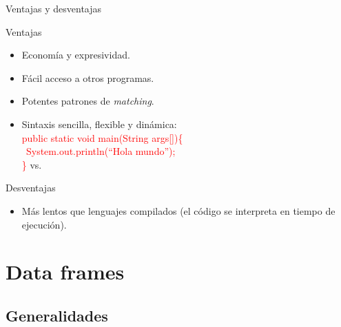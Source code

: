 \documentclass[handout]{beamer} %
\newcommand{\red}[1]{\textcolor{red}{#1}}
\newcommand{\green}[1]{{\color{green!70!black}{#1}}}
\begin{document}
\begin{frame}{Ventajas y desventajas}
  \pause
  \begin{block}{Ventajas}
  \begin{itemize}
    \item Economía y expresividad.
    \item Fácil acceso a otros programas.
    \item Potentes patrones de {\em matching}.
    \item Sintaxis sencilla, flexible y dinámica:\\[1.5ex]
    {\scriptsize
    \red{public static void main(String args[])\{\\
	$~~$System.out.println(``Hola mundo'');\\
    \}} vs.\\
    \green{print ``Hola mundo''}}
  \end{itemize}
  \end{block}
  \pause
  \begin{block}{Desventajas}
  \begin{itemize}
      \item Más lentos que lenguajes compilados (el código se interpreta en tiempo de ejecución).
  \end{itemize}
  \end{block}
\end{frame}

\section{Data frames}

\subsection{Generalidades}
\end{document}

